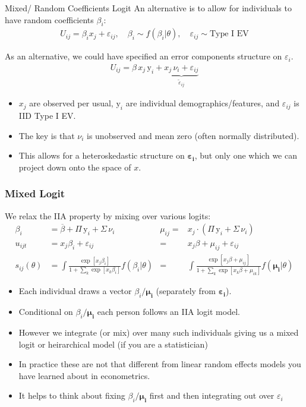 \begin{frame}{Mixed/ Random Coefficients Logit}
An alternative is to allow for individuals to have \alert{random coefficients} $\beta_i$:
\begin{eqnarray*}
U_{ij} = \beta_i x_{j} +  \varepsilon_{ij}, \quad \beta_i \sim f( \beta_i | \theta),  \quad \varepsilon_{ij} \sim \text{Type I EV}
\end{eqnarray*}

As an alternative, we could have specified an error components structure on $\varepsilon_i$.
\begin{align*}
U_{ij} = \beta \, x_{j} \, \textrm{y}_i + \underbrace{x_{j} \, \nu_i  + \varepsilon_{ij}}_{\tilde{\varepsilon}_{ij}}
\end{align*}
\vspace{-0.8cm}
\begin{itemize}
\item $x_{j}$ are observed per usual, $\textrm{y}_i$ are individual demographics/features, and $\varepsilon_{ij}$ is IID Type I EV.
\item The key is that $\nu_i$ is unobserved and mean zero (often normally distributed).
\item This allows for a heteroskedastic structure on $\boldsymbol{\varepsilon_{i}}$, but only one which we can project down onto the space of $x$.
\end{itemize}

\end{frame}


\begin{frame}
\frametitle{Mixed Logit}
We relax the IIA property by mixing over various logits:
\begin{align*}
\beta_i &= \overline{\beta} + \Pi \, \textrm{y}_i  + \Sigma \, \nu_i   
&\mu_{ij}=&   x_{j} \cdot \left(  \Pi \, \textrm{y}_i + \Sigma \, \nu_{i} \right) \\
u_{ijt} &= x_j \beta_i + \varepsilon_{ij}  
&=&  x_j \beta  + \mu_{ij}+ \varepsilon_{ij}   \\
s_{ij}(\theta) &= \int \frac{\exp[x_{j} \beta_i ]}{1+\sum_k \exp[x_{k} \beta_i ]} f(\beta_i | \theta) 
&=& \int \frac{\exp[x_{j} \beta + \mu_{ij} ]}{1+\sum_k \exp[x_{k} \beta+ \mu_{ik} ]} f(\boldsymbol{\mu_i} | \theta)
\end{align*}
 \begin{itemize}
 \item Each individual draws a vector $\beta_i\boldsymbol{/\mu_i}$ (separately from $\boldsymbol{\varepsilon_i}$).
 \item Conditional on $\beta_i\boldsymbol{/\mu_i}$ each person follows an IIA logit model.
 \item However we integrate (or mix) over many such individuals giving us a \alert{mixed logit} or \alert{heirarchical model} (if you are a statistician)
 \item In practice these are not that different from linear \alert{random effects models} you have learned about in econometrics.
 \item It helps to think about fixing $\beta_i\boldsymbol{/\mu_i}$ first and then integrating out over $\varepsilon_i$
 \end{itemize}
\end{frame}


